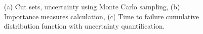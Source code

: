 \begin{figure}[h!]
\begin{subfigure}[b]{0.49\textwidth}
    \caption{}
  \end{subfigure}
  \caption{(a) Cut sets, uncertainty using Monte Carlo sampling, (b) Importance measures calculation, (c) Time to failure cumulative distribution function with uncertainty quantification.}
  \label{fig:quantification_results}
\end{figure}